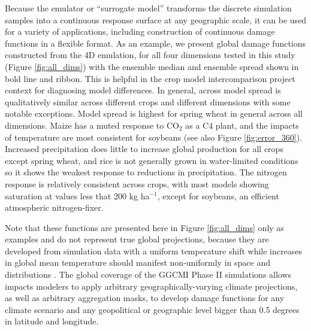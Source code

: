 \documentclass[gmd, manuscript]{copernicus} %
\begin{document}
Because the emulator or ``surrogate model'' transforms the discrete simulation samples into a continuous response surface at any geographic scale, it can be used for a variety of applications, including construction of continuous damage functions in a flexible format. 
As an example, we present global damage functions constructed from the 4D emulation, for all four dimensions tested in this study (Figure \ref{fig:all_dims}) with the ensemble median and ensemble spread shown in bold line and ribbon. 
This is helpful in the crop model intercomparison project context for diagnosing model differences. 
In general, across model spread is qualitatively similar across different crops and different dimensions with some notable exceptions. 
Model spread is highest for spring wheat in general across all dimensions.
Maize has a muted response to CO$_2$ as a C4 plant, and the impacts of temperature are most consistent for soybeans (see also Figure \ref{fig:error_360}).
Increased precipitation does little to increase global production for all crops except spring wheat, and rice is not generally grown in water-limited conditions so it shows the weakest response to reductions in precipitation.
The nitrogen response is relatively consistent across crops, with most models showing saturation at values less that 200 kg ha$^{-1}$, except for soybeans, an efficient atmospheric nitrogen-fixer.

Note that these functions are presented here in Figure \ref{fig:all_dims} only as examples and do not represent true global projections, because they are developed from simulation data with a uniform temperature shift while increases in global mean temperature should manifest non-uniformly in space and distributions \citep[e.g][]{Sippel2015}. 
The global coverage of the GGCMI Phase II simulations allows impacts modelers to apply arbitrary geographically-varying climate projections, as well as arbitrary aggregation masks, to develop damage functions for any climate scenario and any geopolitical or geographic level bigger than 0.5 degrees in latitude and longitude. 
\end{document}
